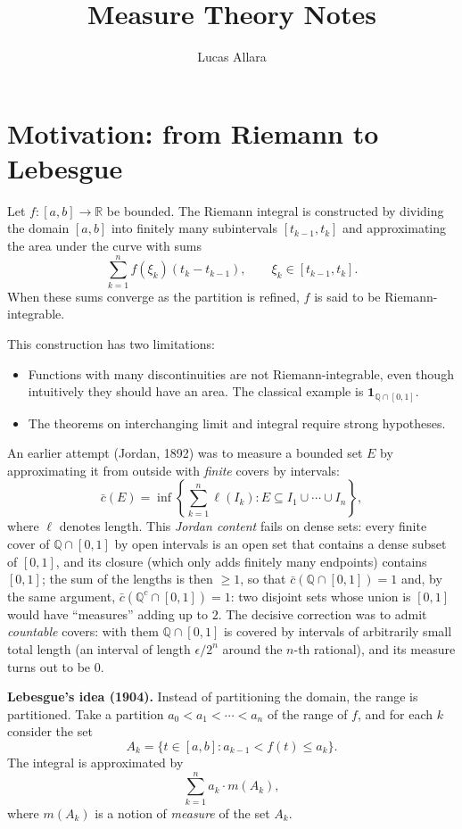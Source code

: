 \documentclass[11pt, a4paper]{article}
\title{
    \vspace{-2cm}
    \textbf{\Huge Measure Theory Notes}\\
    \vspace{0.5cm}
}
\author{Lucas Allara}
\date{}
\begin{document}
\maketitle
\newpage

\tableofcontents
\newpage

\section{Motivation: from Riemann to Lebesgue}

Let $f: [a, b] \to \mathbb{R}$ be bounded. The Riemann integral is constructed by dividing the domain
$[a, b]$ into finitely many subintervals $[t_{k-1}, t_k]$ and approximating the area under the
curve
with sums
$$ \sum_{k=1}^n f(\xi_k) (t_k - t_{k-1}), \qquad \xi_k \in [t_{k-1}, t_k]. $$
When these sums converge as the partition is refined, $f$ is said to be Riemann-integrable.

This construction has two limitations:
\begin{itemize}
    \item Functions with many discontinuities are not Riemann-integrable, even though
    intuitively they should have an area. The classical example is
    $\mathbf{1}_{\mathbb{Q} \cap [0,1]}$.
    \item The theorems on interchanging limit and integral require strong hypotheses.
\end{itemize}

An earlier attempt (Jordan, 1892) was to measure a bounded set $E$ by approximating it from outside
with \emph{finite} covers by intervals:
$$ \bar c(E) = \inf\left\{ \sum_{k=1}^n \ell(I_k) : E \subseteq I_1 \cup \cdots \cup I_n \right\}, $$
where $\ell$ denotes length. This \emph{Jordan content} fails on dense sets:
every finite cover of $\mathbb{Q} \cap [0,1]$ by open intervals is an open set that
contains a dense subset of $[0,1]$, and its closure (which only adds finitely many endpoints) contains
$[0,1]$; the sum of the lengths is then $\ge 1$, so that
$\bar c(\mathbb{Q} \cap [0,1]) = 1$ and, by the same argument,
$\bar c(\mathbb{Q}^c \cap [0,1]) = 1$: two disjoint sets whose union is $[0,1]$ would have
``measures'' adding up to $2$. The decisive correction was to admit \emph{countable} covers:
with them $\mathbb{Q} \cap [0,1]$ is covered by intervals of arbitrarily small total length
(an interval of length $\epsilon/2^n$ around the $n$-th rational), and its measure
turns out to be $0$.

\textbf{Lebesgue's idea (1904).} Instead of partitioning the domain, the range is partitioned. Take a
partition $a_0 < a_1 < \cdots < a_n$ of the range of $f$, and for each $k$ consider the set
$$ A_k = \{ t \in [a, b] : a_{k-1} < f(t) \le a_k \}. $$
The integral is approximated by
$$ \sum_{k=1}^n a_k \cdot m(A_k), $$
where $m(A_k)$ is a notion of \emph{measure} of the set $A_k$.
\end{document}
